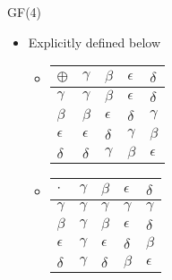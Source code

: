 \documentclass[10pt,ignorenonframetext,]{beamer}
\providecommand{\tightlist}{%
  \setlength{\itemsep}{0pt}\setlength{\parskip}{0pt}}
\begin{document}
\begin{frame}{GF(4)}
\protect\hypertarget{gf4}{}
\begin{itemize}[<+->]
\tightlist
\item
  Explicitly defined below

  \begin{itemize}[<+->]
  \item
    \begin{longtable}[]{@{}lllll@{}}
    \toprule
    \textbf{\(\oplus\)} & \textbf{\(\gamma\)} & \textbf{\(\beta\)} &
    \textbf{\(\epsilon\)} & \textbf{\(\delta\)} \\
    \midrule
    \endhead
    \textbf{\(\gamma\)} & \(\gamma\) & \(\beta\) & \(\epsilon\) &
    \(\delta\) \\
    \textbf{\(\beta\)} & \(\beta\) & \(\epsilon\) & \(\delta\) &
    \(\gamma\) \\
    \textbf{\(\epsilon\)} & \(\epsilon\) & \(\delta\) & \(\gamma\) &
    \(\beta\) \\
    \textbf{\(\delta\)} & \(\delta\) & \(\gamma\) & \(\beta\) &
    \(\epsilon\) \\
    \bottomrule
    \end{longtable}
  \item
    \begin{longtable}[]{@{}lllll@{}}
    \toprule
    \textbf{\(\cdot\)} & \textbf{\(\gamma\)} & \textbf{\(\beta\)} &
    \textbf{\(\epsilon\)} & \textbf{\(\delta\)} \\
    \midrule
    \endhead
    \textbf{\(\gamma\)} & \(\gamma\) & \(\gamma\) & \(\gamma\) &
    \(\gamma\) \\
    \textbf{\(\beta\)} & \(\gamma\) & \(\beta\) & \(\epsilon\) &
    \(\delta\) \\
    \textbf{\(\epsilon\)} & \(\gamma\) & \(\epsilon\) & \(\delta\) &
    \(\beta\) \\
    \textbf{\(\delta\)} & \(\gamma\) & \(\delta\) & \(\beta\) &
    \(\epsilon\) \\
    \bottomrule
    \end{longtable}
  \end{itemize}
\end{itemize}
\end{frame}
\end{document}
